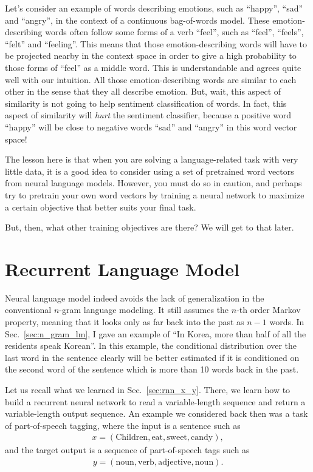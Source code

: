 \documentclass{report}
\begin{document}
Let's consider an example of words describing emotions, such as ``happy'',
``sad'' and ``angry'', in the context of a continuous bag-of-words model. These
emotion-describing words often follow some forms of a verb ``feel'', such as
``feel'', ``feels'', ``felt'' and ``feeling''. This means that those
emotion-describing words will have to be projected nearby in the context space
in order to give a high probability to those forms of ``feel'' as a middle word.
This is understandable and agrees quite well with our intuition. All those
emotion-describing words are similar to each other in the sense that they all
describe emotion. But, wait, this aspect of similarity is not going to help
sentiment classification of words. In fact, this aspect of similarity will {\em
hurt} the sentiment classifier, because a positive word ``happy'' will be close
to negative words ``sad'' and ``angry'' in this word vector space!

The lesson here is that when you are solving a language-related task with very
little data, it is a good idea to consider using a set of pretrained word
vectors from neural language models. However, you must do so in caution, and
perhaps try to pretrain your own word vectors by training a neural network to
maximize a certain objective that better suits your final task.

But, then, what other training objectives are there? We will get to that later.

\section{Recurrent Language Model}
\label{sec:rlm}

Neural language model indeed avoids the lack of generalization in the
conventional $n$-gram language modeling. It still assumes the $n$-th order
Markov property, meaning that it looks only as far back into the past as $n-1$
words. In Sec.~\ref{sec:n_gram_lm}, I gave an example of ``In Korea, more than
half of all the residents speak Korean''. In this example, the conditional
distribution over the last word in the sentence clearly will be better estimated
if it is conditioned on the second word of the sentence which is more than 10
words back in the past.

Let us recall what we learned in Sec.~\ref{sec:rnn_x_y}. There, we learn how to
build a recurrent neural network to read a variable-length sequence and return a
variable-length output sequence. An example we considered back then was a task
of part-of-speech tagging, where the input is a sentence such as
\begin{align*}
    x = (\text{Children}, \text{eat}, \text{sweet}, \text{candy}),
\end{align*}
and the target output is a sequence of part-of-speech tags such as
\begin{align*}
    y = (\text{noun}, \text{verb}, \text{adjective}, \text{noun}).
\end{align*}
\end{document}
